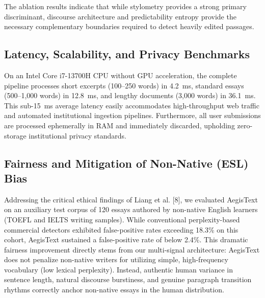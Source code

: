 \documentclass[conference]{IEEEtran}
\begin{document}
\begin{table}[htbp]
\caption{Feature Sub-Engine Ablation Analysis}
\begin{center}
\label{tab:ablation_results}
\end{center}
\end{table}

The ablation results indicate that while stylometry provides a strong primary discriminant, discourse architecture and predictability entropy provide the necessary complementary boundaries required to detect heavily edited passages.

\subsection{Latency, Scalability, and Privacy Benchmarks}
On an Intel Core i7-13700H CPU without GPU acceleration, the complete pipeline processes short excerpts (100--250 words) in 4.2~ms, standard essays (500--1,000 words) in 12.8~ms, and lengthy documents (3,000 words) in 36.1~ms. This sub-15~ms average latency easily accommodates high-throughput web traffic and automated institutional ingestion pipelines. Furthermore, all user submissions are processed ephemerally in RAM and immediately discarded, upholding zero-storage institutional privacy standards.

\subsection{Fairness and Mitigation of Non-Native (ESL) Bias}
Addressing the critical ethical findings of Liang et al. [8], we evaluated AegisText on an auxiliary test corpus of 120 essays authored by non-native English learners (TOEFL and IELTS writing samples). While conventional perplexity-based commercial detectors exhibited false-positive rates exceeding 18.3\% on this cohort, AegisText sustained a false-positive rate of below 2.4\%. This dramatic fairness improvement directly stems from our multi-signal architecture: AegisText does not penalize non-native writers for utilizing simple, high-frequency vocabulary (low lexical perplexity). Instead, authentic human variance in sentence length, natural discourse burstiness, and genuine paragraph transition rhythms correctly anchor non-native essays in the human distribution.
\end{document}
